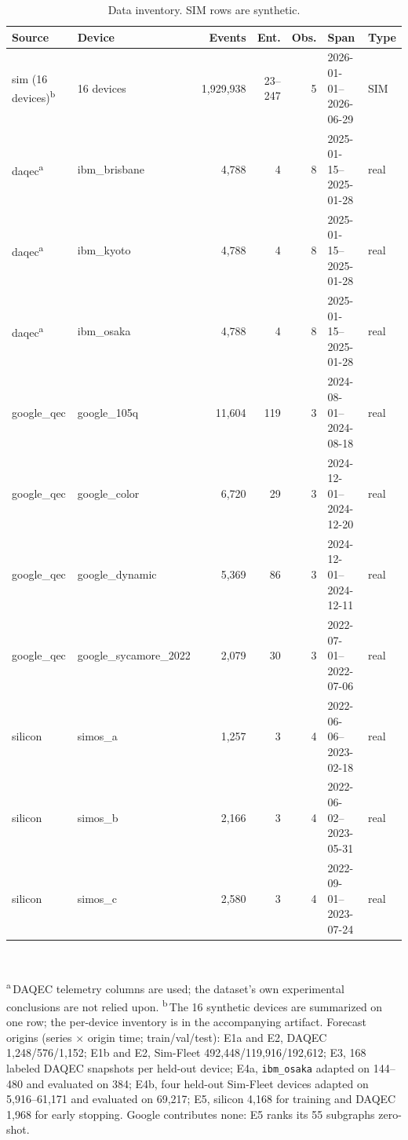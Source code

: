 \documentclass[journal]{IEEEtran}
\begin{document}
\begin{table}[t]\centering\caption{Data inventory. SIM rows are synthetic.}
\label{tab:data}
\footnotesize\setlength{\tabcolsep}{3.5pt}
\begin{tabular}{llrrrll}
\toprule
Source & Device & Events & Ent. & Obs. & Span & Type \\
\midrule
sim (16 devices)\textsuperscript{b} & 16 devices & 1,929,938 & 23--247 & 5 & 2026-01-01--2026-06-29 & SIM \\
daqec\textsuperscript{a} & ibm\_brisbane & 4,788 & 4 & 8 & 2025-01-15--2025-01-28 & real \\
daqec\textsuperscript{a} & ibm\_kyoto & 4,788 & 4 & 8 & 2025-01-15--2025-01-28 & real \\
daqec\textsuperscript{a} & ibm\_osaka & 4,788 & 4 & 8 & 2025-01-15--2025-01-28 & real \\
google\_qec & google\_105q & 11,604 & 119 & 3 & 2024-08-01--2024-08-18 & real \\
google\_qec & google\_color & 6,720 & 29 & 3 & 2024-12-01--2024-12-20 & real \\
google\_qec & google\_dynamic & 5,369 & 86 & 3 & 2024-12-01--2024-12-11 & real \\
google\_qec & google\_sycamore\_2022 & 2,079 & 30 & 3 & 2022-07-01--2022-07-06 & real \\
silicon & simos\_a & 1,257 & 3 & 4 & 2022-06-06--2023-02-18 & real \\
silicon & simos\_b & 2,166 & 3 & 4 & 2022-06-02--2023-05-31 & real \\
silicon & simos\_c & 2,580 & 3 & 4 & 2022-09-01--2023-07-24 & real \\
\bottomrule
\end{tabular}
\\[3pt]{\footnotesize\raggedright \textsuperscript{a}\,DAQEC telemetry columns are
used; the dataset's own experimental conclusions are not relied upon.
\textsuperscript{b}\,The 16 synthetic devices are summarized on one row; the
per-device inventory is in the accompanying artifact. Forecast origins (series
$\times$ origin time; train/val/test): E1a and E2, DAQEC 1,248/576/1,152; E1b and E2,
Sim-Fleet 492,448/119,916/192,612; E3, 168 labeled DAQEC snapshots per held-out device;
E4a, \texttt{ibm\_osaka} adapted on 144--480 and evaluated on 384; E4b, four held-out
Sim-Fleet devices adapted on 5,916--61,171 and evaluated on 69,217; E5, silicon 4,168
for training and DAQEC 1,968 for early stopping. Google contributes none: E5 ranks its
55 subgraphs zero-shot.\par}
\end{table}
\end{document}
